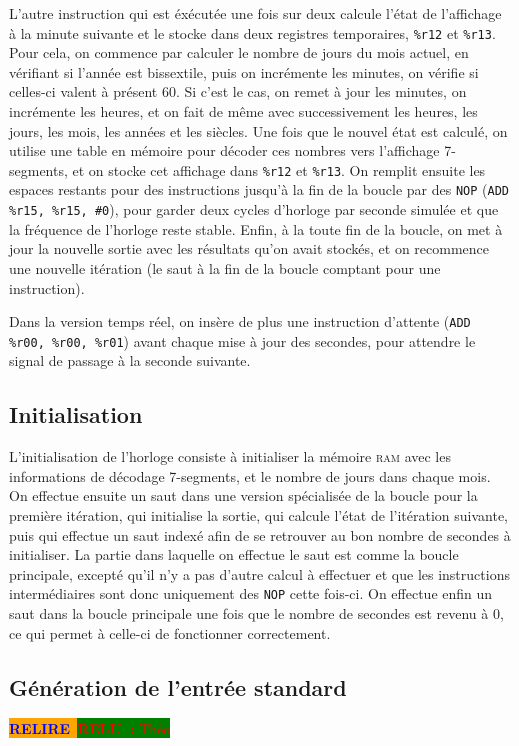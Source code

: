 \documentclass[11pt,a4paper]{article}
\newcommand{\relire}{\colorbox{orange}{\textcolor{blue}{\textbf{RELIRE}~}}}
\newcommand{\relu}[1]{\colorbox{green}{\textcolor{red}{\textbf{RELU~:} #1}}}
\begin{document}
L'autre instruction qui est éxécutée une fois sur deux calcule l'état
de l'affichage à la minute suivante et le stocke dans deux registres
temporaires, \verb!%r12! et \verb!%r13!. Pour cela, on commence par
calculer le nombre de jours du mois actuel, en vérifiant si l'année
est bissextile, puis on incrémente les minutes, on vérifie si
celles-ci valent à présent 60. Si c'est le cas, on remet à jour les
minutes, on incrémente les heures, et on fait de même avec
successivement les heures, les jours, les mois, les années et les
siècles. Une fois que le nouvel état est calculé, on utilise une table
en mémoire pour décoder ces nombres vers l'affichage 7-segments, et on
stocke cet affichage dans \verb!%r12! et \verb!%r13!. On remplit
ensuite les espaces restants pour des instructions jusqu'à la fin de
la boucle par des \verb!NOP! (\verb!ADD %r15, %r15, #0!), pour garder
deux cycles d'horloge par seconde simulée et que la fréquence de
l'horloge reste stable. Enfin, à la toute fin de la boucle, on met à
jour la nouvelle sortie avec les résultats qu'on avait stockés, et on
recommence une nouvelle itération (le saut à la fin de la boucle
comptant pour une instruction).

Dans la version temps réel, on insère de plus une instruction
d'attente (\verb!ADD %r00, %r00, %r01!) avant chaque mise à jour des
secondes, pour attendre le signal de passage à la seconde suivante.

\subsection{Initialisation}

L'initialisation de l'horloge consiste à initialiser la mémoire
\textsc{ram} avec les informations de décodage 7-segments, et le
nombre de jours dans chaque mois. On effectue ensuite un saut dans une
version spécialisée de la boucle pour la première itération, qui
initialise la sortie, qui calcule l'état de l'itération suivante, puis
qui effectue un saut indexé afin de se retrouver au bon nombre de
secondes à initialiser. La partie dans laquelle on effectue le saut
est comme la boucle principale, excepté qu'il n'y a pas d'autre calcul
à effectuer et que les instructions intermédiaires sont donc
uniquement des \verb!NOP! cette fois-ci. On effectue enfin un saut
dans la boucle principale une fois que le nombre de secondes est
revenu à 0, ce qui permet à celle-ci de fonctionner correctement.

\subsection{Génération de l'entrée standard}
\relire  \relu{Théo}
\end{document}
